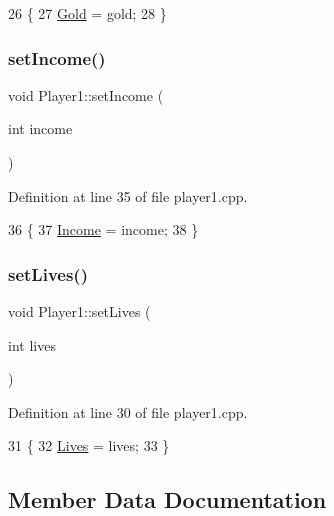 \begin{DoxyCode}
26 \{
27     \hyperlink{class_player1_ab390478b345e443398bac442a04b675c}{Gold} = gold;
28 \}
\end{DoxyCode}
\mbox{\label{class_player1_a2e44127463fa785a00a0e118d5e8cf4f}} 
\subsubsection{\texorpdfstring{set\+Income()}{setIncome()}}
{\footnotesize\ttfamily void Player1\+::set\+Income (\begin{DoxyParamCaption}\item[{int}]{income }\end{DoxyParamCaption})}



Definition at line 35 of file player1.\+cpp.


\begin{DoxyCode}
36 \{
37     \hyperlink{class_player1_a414fae948c79246f6a98554718f0cd99}{Income} = income;
38 \}
\end{DoxyCode}
\mbox{\label{class_player1_ac12457900903d22789531287e9934b8b}} 
\subsubsection{\texorpdfstring{set\+Lives()}{setLives()}}
{\footnotesize\ttfamily void Player1\+::set\+Lives (\begin{DoxyParamCaption}\item[{int}]{lives }\end{DoxyParamCaption})}



Definition at line 30 of file player1.\+cpp.


\begin{DoxyCode}
31 \{
32     \hyperlink{class_player1_aacba034528d5c9fdefa4f246fe526a38}{Lives} = lives;
33 \}
\end{DoxyCode}


\subsection{Member Data Documentation}
\mbox{\label{class_player1_ab390478b345e443398bac442a04b675c}} 
